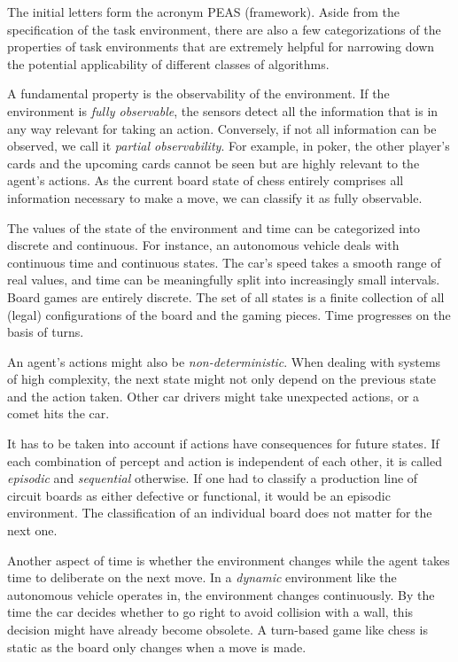 The initial letters form the acronym PEAS (framework). Aside from the specification of the task environment, there are also a few categorizations of the properties of task environments that are extremely helpful for narrowing down the potential applicability of different classes of algorithms.

A fundamental property is the observability of the environment. If the environment is \textit{fully observable}, the sensors detect all the information that is in any way relevant for taking an action. Conversely, if not all information can be observed, we call it \textit{partial observability}. For example, in poker, the other player's cards and the upcoming cards cannot be seen but are highly relevant to the agent's actions. As the current board state of chess entirely comprises all information necessary to make a move, we can classify it as fully observable.

The values of the state of the environment and time can be categorized into discrete and continuous. For instance, an autonomous vehicle deals with continuous time and continuous states. The car's speed takes a smooth range of real values, and time can be meaningfully split into increasingly small intervals. Board games are entirely discrete. The set of all states is a finite collection of all (legal) configurations of the board and the gaming pieces. Time progresses on the basis of turns.

An agent's actions might also be \textit{non-deterministic}. When dealing with systems of high complexity, the next state might not only depend on the previous state and the action taken. Other car drivers might take unexpected actions, or a comet hits the car.

It has to be taken into account if actions have consequences for future states. If each combination of percept and action is independent of each other, it is called \textit{episodic} and \textit{sequential} otherwise. If one had to classify a production line of circuit boards as either defective or functional, it would be an episodic environment. The classification of an individual board does not matter for the next one.

Another aspect of time is whether the environment changes while the agent takes time to deliberate on the next move. In a \textit{dynamic} environment like the autonomous vehicle operates in, the environment changes continuously. By the time the car decides whether to go right to avoid collision with a wall, this decision might have already become obsolete. A turn-based game like chess is static as the board only changes when a move is made.

